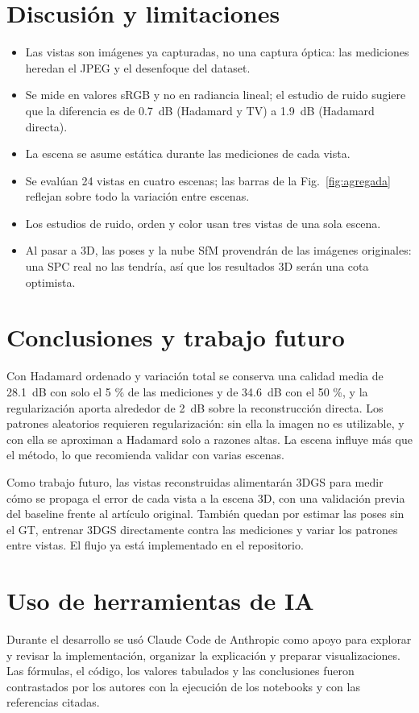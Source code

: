 \documentclass[conference]{IEEEtran}
\begin{document}
\section{Discusión y limitaciones}
\begin{itemize}
\item Las vistas son imágenes ya capturadas, no una captura óptica: las mediciones heredan el JPEG y el desenfoque del dataset.
\item Se mide en valores sRGB y no en radiancia lineal; el estudio de ruido sugiere que la diferencia es de 0.7~dB (Hadamard y TV) a 1.9~dB (Hadamard directa).
\item La escena se asume estática durante las mediciones de cada vista.
\item Se evalúan 24 vistas en cuatro escenas; las barras de la Fig.~\ref{fig:agregada} reflejan sobre todo la variación entre escenas.
\item Los estudios de ruido, orden y color usan tres vistas de una sola escena.
\item Al pasar a 3D, las poses y la nube SfM provendrán de las imágenes originales: una SPC real no las tendría, así que
los resultados 3D serán una cota optimista.
\end{itemize}

\section{Conclusiones y trabajo futuro}
Con Hadamard ordenado y variación total se conserva una calidad media de 28.1~dB con solo el 5 \% de las mediciones y de
34.6~dB con el 50 \%, y la regularización aporta alrededor de 2~dB sobre la reconstrucción directa. Los patrones
aleatorios requieren regularización: sin ella la imagen no es utilizable, y con ella se aproximan a Hadamard solo a
razones altas. La escena influye más que el método, lo que recomienda validar con varias escenas.

Como trabajo futuro, las vistas reconstruidas alimentarán 3DGS \cite{kerbl2023} para medir cómo se propaga el error de
cada vista a la escena 3D, con una validación previa del baseline frente al artículo original. También quedan por
estimar las poses sin el GT, entrenar 3DGS directamente contra las mediciones y variar los patrones entre vistas. El
flujo ya está implementado en el repositorio.

\section*{Uso de herramientas de IA}
Durante el desarrollo se usó Claude Code de Anthropic como apoyo para explorar y revisar la implementación, organizar
la explicación y preparar visualizaciones. Las fórmulas, el código, los valores tabulados y las conclusiones fueron
contrastados por los autores con la ejecución de los notebooks y con las referencias citadas.



\end{document}
